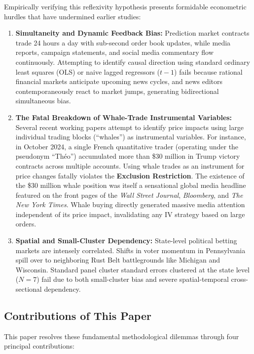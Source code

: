 \documentclass[12pt, a4paper]{article}
\begin{document}
Empirically verifying this reflexivity hypothesis presents formidable econometric hurdles that have undermined earlier studies:
\begin{enumerate}
    \item \textbf{Simultaneity and Dynamic Feedback Bias:} Prediction market contracts trade 24 hours a day with sub-second order book updates, while media reports, campaign statements, and social media commentary flow continuously. Attempting to identify causal direction using standard ordinary least squares (OLS) or naive lagged regressors ($t-1$) fails because rational financial markets anticipate upcoming news cycles, and news editors contemporaneously react to market jumps, generating bidirectional simultaneous bias.
    \item \textbf{The Fatal Breakdown of Whale-Trade Instrumental Variables:} Several recent working papers attempt to identify price impacts using large individual trading blocks (``whales'') as instrumental variables. For instance, in October 2024, a single French quantitative trader (operating under the pseudonym ``Th\'eo'') accumulated more than \$30 million in Trump victory contracts across multiple accounts. Using whale trades as an instrument for price changes fatally violates the \textbf{Exclusion Restriction}. The existence of the \$30 million whale position was itself a sensational global media headline featured on the front pages of the \textit{Wall Street Journal}, \textit{Bloomberg}, and \textit{The New York Times}. Whale buying directly generated massive media attention independent of its price impact, invalidating any IV strategy based on large orders.
    \item \textbf{Spatial and Small-Cluster Dependency:} State-level political betting markets are intensely correlated. Shifts in voter momentum in Pennsylvania spill over to neighboring Rust Belt battlegrounds like Michigan and Wisconsin. Standard panel cluster standard errors clustered at the state level ($N=7$) fail due to both small-cluster bias and severe spatial-temporal cross-sectional dependency.
\end{enumerate}

\subsection{Contributions of This Paper}
This paper resolves these fundamental methodological dilemmas through four principal contributions:
\end{document}
